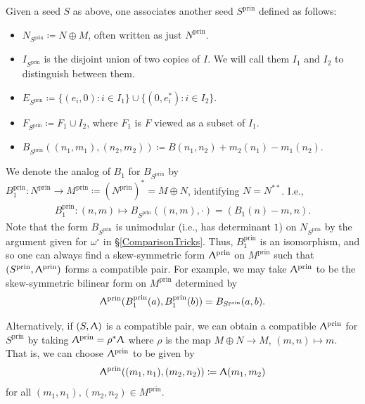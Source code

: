 \documentclass{amsart}
\DeclareMathOperator{\prin}{prin}
\let\rar=\rightarrow
\renewcommand{\Lambda}{\Uplambda}
\theoremstyle{plain}%
\theoremstyle{definition}
\theoremstyle{remark}
\begin{document}
Given a seed $S$ as above, one associates another seed $S^{\prin}$ defined as follows:
\begin{itemize}[noitemsep]
\item $N_{S^{\prin}}\coloneqq N\oplus M$, often written as just $N^{\prin}$.
\item $I_{S^{\prin}}$ is the disjoint union of two copies of $I$.  We will call them $I_1$ and $I_2$ to distinguish between them.
\item $E_{S^{\prin}}\coloneqq \{(e_i,0)\colon i\in I_1\} \cup \{(0,e_i^*)\colon i \in I_2\}$.
\item $F_{S^{\prin}}\coloneqq F_1\cup I_2$, where $F_1$ is $F$ viewed as a subset of $I_1$.
\item $B_{S^{\prin}}((n_1,m_1), (n_2,m_2)) \coloneqq B(n_1,n_2) + m_2(n_1) - m_1(n_2)$.
\end{itemize}
We denote the analog of $B_1$ for $B_{S^{\prin}}$ by $B^{\prin}_1\colon N^{\prin}\rar M^{\prin}\coloneqq (N^{\prin})^* = M\oplus N$, identifying $N=N^{**}$.  I.e.,
\begin{align}\label{pi1prin}
    B^{\prin}_1\colon (n,m)\mapsto B_{S^{\prin}}((n,m),\cdot) = (B_1(n)-m,n).
\end{align}
Note that the form $B_{S^{\prin}}$ is unimodular (i.e., has determinant $1$) on $N_{S^{\prin}}$ by the argument given for $\omega^{\circ}$ in \S \ref{ComparisonTricks}.  Thus, $B^{\prin}_1$ is an isomorphism, and so one can always find a skew-symmetric form $\Lambda^{\prin}$ on $M^{\prin}$ such that $(S^{\prin},\Lambda^{\prin})$ forms a compatible pair.  For example, we may take $\Lambda^{\prin}$ to be the skew-symmetric bilinear form on $M^{\prin}$ determined by 
\begin{align}\label{LambdaPrin}
    \Lambda^{\prin}(B^{\prin}_1(a),B^{\prin}_1(b))=B_{S^{\prin}}(a,b).
\end{align}

Alternatively, if $(S,\Lambda)$ is a compatible pair, we can obtain a compatible $\Lambda^{\prin}$ for $S^{\prin}$ by taking $\Lambda^{\prin}=\rho^* \Lambda$ where $\rho$ is the map $M\oplus N\rar M$, $(m,n)\mapsto m$.  That is, we can choose $\Lambda^{\prin}$ to be given by
\begin{align}\label{Lambda_rho}
\Lambda^{\prin}((m_1,n_1),(m_2,n_2))\coloneqq \Lambda(m_1,m_2)
\end{align}
for all $(m_1,n_1),(m_2,n_2)\in M^{\prin}$.
\end{document}

